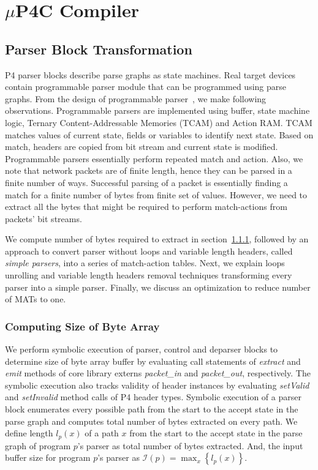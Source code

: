 \documentclass{hotnets19}
\begin{document}
\section{$\mu$P4C Compiler}
\label{section-mp4c-compiler}

\subsection{Parser Block Transformation}
\label{subsection:parser-block-transformation}
P4 parser blocks describe parse graphs as state machines.
Real target devices contain programmable parser module that can be programmed using parse graphs.
From the design of programmable parser~\cite{6665172}, we make following observations.
Programmable parsers are implemented using buffer, state machine logic, Ternary Content-Addressable Memories (TCAM) and Action RAM. 
TCAM matches values of current state, fields or variables to identify next state. 
Based on match, headers are copied from bit stream and current state is modified.
Programmable parsers essentially perform repeated match and action.
Also, we note that network packets are of finite length, hence they can be parsed in a finite number of ways.
Successful parsing of a packet is essentially finding a match for a finite number of bytes from finite set of values.
However, we need to extract all the bytes that might be required to perform match-actions from packets' bit streams.


We compute number of bytes required to extract in section~\ref{subsubsection:computing-size-of-byte-array}, followed by an approach to convert parser without loops and variable length headers, called \textit{simple parsers}, into a series of match-action tables.
Next, we explain loops unrolling and variable length headers removal techniques transforming every parser into a simple parser.
Finally, we discuss an optimization to reduce number of MATs to one.


\subsubsection{Computing Size of Byte Array}
\label{subsubsection:computing-size-of-byte-array}
We perform symbolic execution of parser, control and deparser blocks to determine size of byte array buffer by evaluating call statements of \emph{extract} and \emph{emit} methods of core library externs \emph{packet\_in} and \emph{packet\_out}, respectively.
The symbolic execution also tracks validity of header instances by evaluating \emph{setValid} and \emph{setInvalid} method calls of P4 header types.
Symbolic execution of a parser block enumerates every possible path from the start to the accept state in the parse graph and computes total number of bytes extracted on every path.
We define length $l_{p}(x)$ of a path $x$ from the start to the accept state in the parse graph of program $p$'s parser as total number of bytes extracted.
And, the input buffer size for program $p$'s parser as $\mathcal{I}(p) = \max_{x}\left\{l_{p}(x)\right\}$. 
\end{document}
